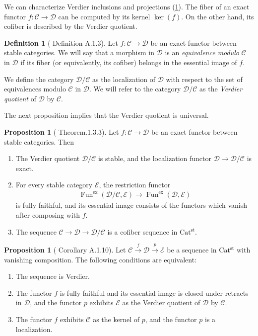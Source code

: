 \documentclass[a4paper,dvipdfmx,11pt,reqno]{amsart}
\DeclareMathOperator{\Fun}{Fun}
\newcommand{\C}{\mathcal{C}}
\newcommand{\D}{\mathcal{D}}
\newcommand{\E}{\mathcal{E}}
\newcommand{\Catst}{\mathrm{Cat^{st}}}
\theoremstyle{definition}
\newtheorem{definition}[theorem]{Definition}
\newtheorem{proposition}[theorem]{Proposition}
\begin{document}
We can characterize Verdier inclusions and projections (\cref{CDH23.cor.A.1.10}).
The fiber of an exact functor $f : \C \to \D$ can be computed by its kernel $\ker(f)$.
On the other hand, its cofiber is described by the Verdier quotient.

\begin{definition}[\cite{CDH23} Definition A.1.3] \label{CDH23.def.A.1.3}
  Let $f : \C \to \D$ be an exact functor between stable categories.
  We will say that a morphism in $\D$ is an \textit{equivalence modulo} $\C$ in $\D$ if its fiber (or equivalently, its cofiber) belongs in the essential image of $f$.

  We define the category $\D/\C$ as the localization of $\D$ with respect to the set of equivalences modulo $\C$ in $\D$.
  We will refer to the category $\D/\C$ as the \textit{Verdier quotient} of $\D$ by $\C$.
\end{definition}

The next proposition implies that the Verdier quotient is universal.

\begin{proposition}[\cite{NS18} Theorem.1.3.3] \label{NS18.thrm.1.3.3}
  Let $f : \C \to \D$ be an exact functor between stable categories.
  Then
  \begin{enumerate}
    \item The Verdier quotient $\D/\C$ is stable, and the localization functor $\D \to \D/\C$ is exact.
    \item For every stable category $\E$, the restriction functor
    \begin{align*}
      \Fun^{\mathrm{ex}}(\D/\C,\E) \to \Fun^{\mathrm{ex}}(\D,\E)
    \end{align*}
    is fully faithful, and its essential image consists of the functors which vanish after composing with $f$.
    \item The sequence $\C \to \D \to \D/\C$ is a cofiber sequence in $\Catst$.
  \end{enumerate} 
\end{proposition}

\begin{proposition}[\cite{CDH23} Corollary A.1.10] \label{CDH23.cor.A.1.10}
  Let $\C \xrightarrow{f} \D \xrightarrow{p} \E$ be a sequence in $\Catst$ with vanishing composition.
  The following conditions are equivalent:
  \begin{enumerate}
    \item The sequence is Verdier.
    \item The functor $f$ is fully faithful and its essential image is closed under retracts in $\D$, and the functor $p$ exhibits $\E$ as the Verdier quotient of $\D$ by $\C$.
    \item The functor $f$ exhibits $\C$ as the kernel of $p$, and the functor $p$ is a localization.
  \end{enumerate}
\end{proposition}
\end{document}
